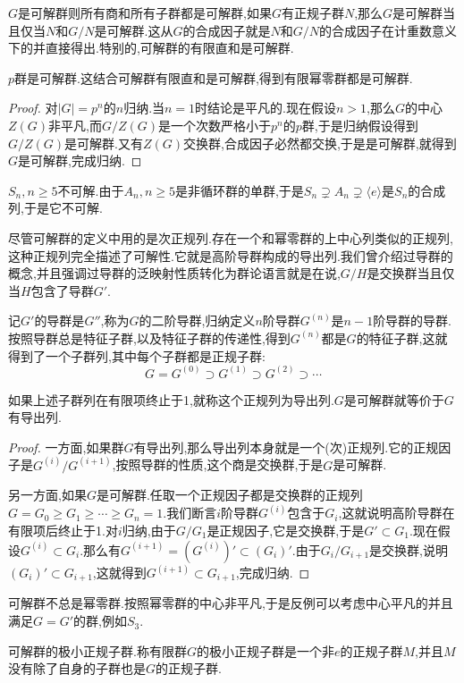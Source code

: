 $G$是可解群则所有商和所有子群都是可解群,如果$G$有正规子群$N$,那么$G$是可解群当且仅当$N$和$G/N$是可解群.这从$G$的合成因子就是$N$和$G/N$的合成因子在计重数意义下的并直接得出.特别的,可解群的有限直和是可解群.

$p$群是可解群.这结合可解群有限直和是可解群,得到有限幂零群都是可解群.
\begin{proof}
	
	对$|G|=p^n$的$n$归纳.当$n=1$时结论是平凡的.现在假设$n>1$,那么$G$的中心$Z(G)$非平凡,而$G/Z(G)$是一个次数严格小于$p^n$的$p$群,于是归纳假设得到$G/Z(G)$是可解群.又有$Z(G)$交换群,合成因子必然都交换,于是是可解群,就得到$G$是可解群,完成归纳.
\end{proof}

$S_n,n\ge 5$不可解.由于$A_n,n\ge5$是非循环群的单群,于是$S_n\supsetneq A_n\supsetneq\langle e\rangle$是$S_n$的合成列,于是它不可解.

尽管可解群的定义中用的是次正规列.存在一个和幂零群的上中心列类似的正规列,这种正规列完全描述了可解性.它就是高阶导群构成的导出列.我们曾介绍过导群的概念,并且强调过导群的泛映射性质转化为群论语言就是在说,$G/H$是交换群当且仅当$H$包含了导群$G'$.

记$G'$的导群是$G''$,称为$G$的二阶导群,归纳定义$n$阶导群$G^{(n)}$是$n-1$阶导群的导群.按照导群总是特征子群,以及特征子群的传递性,得到$G^{(n)}$都是$G$的特征子群,这就得到了一个子群列,其中每个子群都是正规子群:
$$G=G^{(0)}\supset G^{(1)}\supset G^{(2)}\supset\cdots$$

如果上述子群列在有限项终止于1,就称这个正规列为导出列.$G$是可解群就等价于$G$有导出列.
\begin{proof}
	
	一方面,如果群$G$有导出列,那么导出列本身就是一个(次)正规列.它的正规因子是$G^{(i)}/G^{(i+1)}$,按照导群的性质,这个商是交换群,于是$G$是可解群.
	
	另一方面,如果$G$是可解群.任取一个正规因子都是交换群的正规列$G=G_0\ge G_1\ge\cdots\ge G_n=1$.我们断言$i$阶导群$G^{(i)}$包含于$G_i$,这就说明高阶导群在有限项后终止于1.对$i$归纳,由于$G/G_1$是正规因子,它是交换群,于是$G'\subset G_1$.现在假设$G^{(i)}\subset G_i$.那么有$G^{(i+1)}=(G^{(i)})'\subset (G_i)'$.由于$G_i/G_{i+1}$是交换群,说明$(G_i)'\subset G_{i+1}$,这就得到$G^{(i+1)}\subset G_{i+1}$,完成归纳.
\end{proof}

可解群不总是幂零群.按照幂零群的中心非平凡,于是反例可以考虑中心平凡的并且满足$G=G'$的群,例如$S_3$.

可解群的极小正规子群.称有限群$G$的极小正规子群是一个非${e}$的正规子群$M$,并且$M$没有除了自身的子群也是$G$的正规子群.

